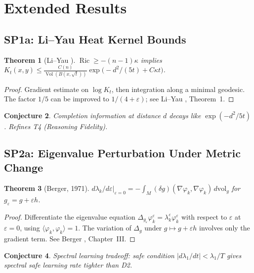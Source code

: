\documentclass[11pt]{article}
\newtheorem{theorem}{Theorem}[section]
\newtheorem{conjecture}[theorem]{Conjecture}
\theoremstyle{definition}
\theoremstyle{remark}
\newcommand{\Ric}{\operatorname{Ric}}
\newcommand{\Vol}{\operatorname{Vol}}
\newcommand{\dvol}{\,d\mathrm{vol}}
\begin{document}
\section{Extended Results}
\label{sec:extended}

\subsection{SP1a: Li--Yau Heat Kernel Bounds}

\begin{theorem}[Li--Yau {\cite{LiYau}}]\label{thm:liyau2}
$\Ric \ge -(n-1)\kappa$ implies $K_t(x,y) \le \frac{C(n)}{\Vol(B(x,\sqrt{t}))}\exp\bigl(-d^2/(5t) + C\kappa t\bigr)$.
\end{theorem}

\begin{proof}
Gradient estimate on $\log K_t$, then integration along a minimal geodesic. The factor $1/5$ can be improved to $1/(4+\varepsilon)$; see Li--Yau \cite{LiYau}, Theorem~1.
\end{proof}

\begin{conjecture}\label{conj:liyau}
Completion information at distance $d$ decays like $\exp(-d^2/5t)$. Refines T4 (Reasoning Fidelity).
\end{conjecture}

\subsection{SP2a: Eigenvalue Perturbation Under Metric Change}

\begin{theorem}[Berger, 1971]\label{thm:perturb}
$d\lambda_k/d\varepsilon\big|_{\varepsilon=0} = -\int_M (\delta g)(\nabla\varphi_k, \nabla\varphi_k)\dvol_g$ for $g_\varepsilon = g + \varepsilon h$.
\end{theorem}

\begin{proof}
Differentiate the eigenvalue equation $\Delta_{g_\varepsilon}\varphi_k^\varepsilon = \lambda_k^\varepsilon\varphi_k^\varepsilon$ with respect to $\varepsilon$ at $\varepsilon = 0$, using $\langle\varphi_k, \varphi_k\rangle = 1$. The variation of $\Delta_g$ under $g \mapsto g + \varepsilon h$ involves only the gradient term. See Berger \cite{BGM}, Chapter~III.
\end{proof}

\begin{conjecture}\label{conj:perturb}
Spectral learning tradeoff: safe condition $|d\lambda_1/dt| < \lambda_1/T$ gives spectral safe learning rate tighter than D2.
\end{conjecture}
\end{document}
